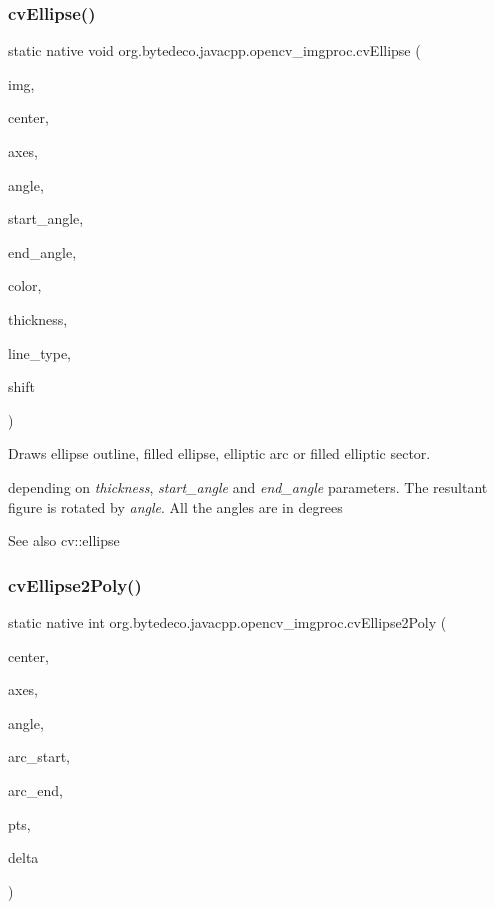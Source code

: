 \subsubsection{\texorpdfstring{cv\+Ellipse()}{cvEllipse()}}
{\footnotesize\ttfamily static native void org.\+bytedeco.\+javacpp.\+opencv\+\_\+imgproc.\+cv\+Ellipse (\begin{DoxyParamCaption}\item[{Cv\+Arr}]{img,  }\item[{@By\+Val Cv\+fr.antproject.utils.Point}]{center,  }\item[{@By\+Val Cv\+Size}]{axes,  }\item[{double}]{angle,  }\item[{double}]{start\+\_\+angle,  }\item[{double}]{end\+\_\+angle,  }\item[{@By\+Val Cv\+Scalar}]{color,  }\item[{int}]{thickness,  }\item[{int}]{line\+\_\+type,  }\item[{int}]{shift }\end{DoxyParamCaption})\hspace{0.3cm}{\ttfamily [static]}}



Draws ellipse outline, filled ellipse, elliptic arc or filled elliptic sector. 

depending on {\itshape thickness}, {\itshape start\+\_\+angle} and {\itshape end\+\_\+angle} parameters. The resultant figure is rotated by {\itshape angle}. All the angles are in degrees \begin{DoxySeeAlso}{See also}
cv\+::ellipse 
\end{DoxySeeAlso}
\mbox{\label{group__imgproc__c_ga4636892155a3d693c0906197d7777d0c}} 
\subsubsection{\texorpdfstring{cv\+Ellipse2\+Poly()}{cvEllipse2Poly()}}
{\footnotesize\ttfamily static native int org.\+bytedeco.\+javacpp.\+opencv\+\_\+imgproc.\+cv\+Ellipse2\+Poly (\begin{DoxyParamCaption}\item[{@By\+Val Cv\+fr.antproject.utils.Point}]{center,  }\item[{@By\+Val Cv\+Size}]{axes,  }\item[{int}]{angle,  }\item[{int}]{arc\+\_\+start,  }\item[{int}]{arc\+\_\+end,  }\item[{Cv\+fr.antproject.utils.Point}]{pts,  }\item[{int}]{delta }\end{DoxyParamCaption})\hspace{0.3cm}{\ttfamily [static]}}



